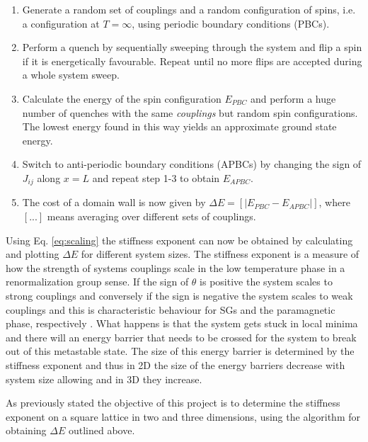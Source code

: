 \documentclass[paper=a4, fontsize=11pt]{scrartcl} %
\numberwithin{equation}{section} %
\numberwithin{figure}{section} %
\numberwithin{table}{section} %
\newcommand{\commutator}[1]{\ensuremath{\left[ #1 \right]}}
\begin{document}
\begin{enumerate}
\item Generate a random set of couplings and a random configuration of spins, i.e. a configuration at $T=\infty$, using periodic boundary conditions (PBCs).
\item Perform a quench by sequentially sweeping through the system and flip a spin if it is energetically favourable. Repeat until no more flips are accepted during a whole system sweep.
\item Calculate the energy of the spin configuration $E_{PBC}$ and perform a huge number of quenches with the same \emph{couplings} but random spin configurations. The lowest energy found in this way yields an approximate ground state energy.
\item Switch to anti-periodic boundary conditions (APBCs) by changing the sign of $J_{ij}$ along $x=L$ and repeat step 1-3 to obtain $E_{APBC}$.
\item The cost of a domain wall is now given by $\Delta E = \commutator{|E_{PBC}-E_{APBC}|}$, where $[...]$ means averaging over different sets of couplings.
\end{enumerate}
Using Eq. \eqref{eq:scaling} the stiffness exponent can now be obtained by calculating and plotting $\Delta E$ for different system sizes. The stiffness exponent is a measure of how the strength of systems couplings scale in the low temperature phase in a renormalization group sense. If the sign of $\theta$ is positive the system scales to strong couplings and conversely if the sign is negative the system scales to weak couplings and this is characteristic behaviour for SGs and the paramagnetic phase, respectively \cite{almeida}. What happens is that the system gets stuck in local minima and there will an energy barrier that needs to be crossed for the system to break out of this metastable state. The size of this energy barrier is determined by the stiffness exponent and thus in 2D the size of the energy barriers decrease with system size allowing and in 3D they increase.

As previously stated the objective of this project is to determine the stiffness exponent on a square lattice in two and three dimensions, using the algorithm for obtaining $\Delta E$ outlined above.
\end{document}
